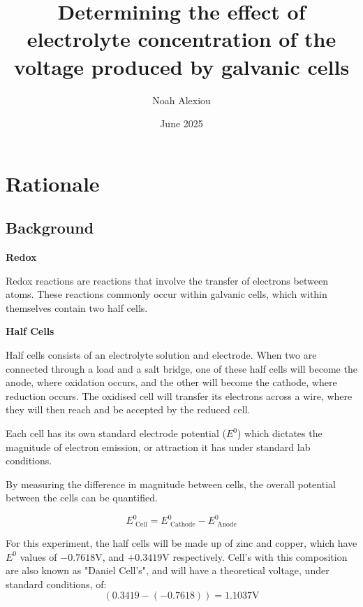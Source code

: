 \documentclass[11pt,a4paper]{article}
\begin{document}
	\nocite{*}
	
	\begin{titlepage}
		
		
		\title{Determining the effect of electrolyte concentration of the voltage produced by galvanic cells}
		
		\author{Noah Alexiou}
		
		
		\date{June 2025}
		
		\maketitle
		\centering
		
	\end{titlepage}
	\tableofcontents
	\newpage
	
	
	\section{Rationale}
	
	
	\subsection{Background}

	

	\textbf{Redox}
	
	Redox reactions are reactions that involve the transfer of electrons between atoms. These reactions commonly occur within galvanic cells, which within themselves contain two half cells. 
	

	\textbf{Half Cells}
	
	Half cells consists of an electrolyte solution and electrode. When two are connected through a load and a salt  bridge, one of these half cells will become the anode, where oxidation occurs, and the other will become the cathode, where reduction occurs. The oxidised cell will transfer its electrons across a wire, where they will then reach and be accepted by the reduced cell.
	
	Each cell has its own standard electrode potential ($E^0$) which dictates the magnitude of electron emission, or attraction it has under standard lab conditions. 
	
	By measuring the difference in magnitude between cells, the overall potential between the cells can be quantified. 
	
	$$
	E^0_{\textrm{ Cell}}=E^0_{\textrm{ Cathode}}-E^0_{\textrm{ Anode}}
	$$
	
	For this experiment, the half cells will be made up of zinc and copper, which have $E^0$ values of $-0.7618$V, and $+0.3419$V respectively. Cell's with this composition are also known as "Daniel Cell's", and will have a theoretical voltage, under standard conditions, of: $$(0.3419-(-0.7618))=1.1037\textrm{V}$$
	
\end{document}
